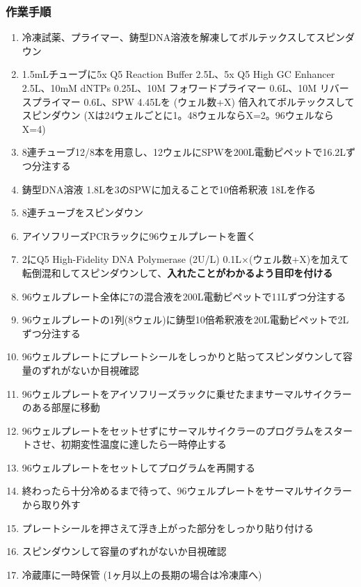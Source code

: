 \documentclass[titlepage,10pt,a4paper]{jsbook}
\begin{document}
\subsubsection{作業手順}
\begin{enumerate}
\item 冷凍試薬、プライマー、鋳型DNA溶液を解凍してボルテックスしてスピンダウン
\item 1.5mLチューブに5x Q5 Reaction Buffer 2.5{\textmu}L、5x Q5 High GC Enhancer 2.5{\textmu}L、10mM dNTPs 0.25{\textmu}L、10{\textmu}M フォワードプライマー 0.6{\textmu}L、10{\textmu}M リバースプライマー 0.6{\textmu}L、SPW 4.45{\textmu}Lを (ウェル数+X) 倍入れてボルテックスしてスピンダウン (Xは24ウェルごとに1。48ウェルならX=2。96ウェルならX=4)
\item 8連チューブ12/8本を用意し、12ウェルにSPWを200{\textmu}L電動ピペットで16.2{\textmu}Lずつ分注する
\item 鋳型DNA溶液 1.8{\textmu}Lを3のSPWに加えることで10倍希釈液 18{\textmu}Lを作る
\item 8連チューブをスピンダウン
\item アイソフリーズPCRラックに96ウェルプレートを置く
\item 2にQ5 High-Fidelity DNA Polymerase (2U/{\textmu}L) 0.1{\textmu}L×(ウェル数+X)を加えて転倒混和してスピンダウンして、\textbf{入れたことがわかるよう目印を付ける}
\item 96ウェルプレート全体に7の混合液を200{\textmu}L電動ピペットで11{\textmu}Lずつ分注する
\item 96ウェルプレートの1列(8ウェル)に鋳型10倍希釈液を20{\textmu}L電動ピペットで2{\textmu}Lずつ分注する
\item 96ウェルプレートにプレートシールをしっかりと貼ってスピンダウンして容量のずれがないか目視確認
\item 96ウェルプレートをアイソフリーズラックに乗せたままサーマルサイクラーのある部屋に移動
\item 96ウェルプレートをセットせずにサーマルサイクラーのプログラムをスタートさせ、初期変性温度に達したら一時停止する
\item 96ウェルプレートをセットしてプログラムを再開する
\item 終わったら十分冷めるまで待って、96ウェルプレートをサーマルサイクラーから取り外す
\item プレートシールを押さえて浮き上がった部分をしっかり貼り付ける
\item スピンダウンして容量のずれがないか目視確認
\item 冷蔵庫に一時保管 (1ヶ月以上の長期の場合は冷凍庫へ)
\end{enumerate}
\end{document}
